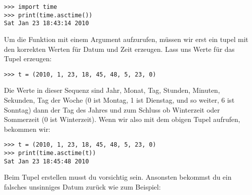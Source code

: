 \begin{Verbatim}[frame=single]
>>> import time
>>> print(time.asctime())
Sat Jan 23 18:43:14 2010
\end{Verbatim}


\noindent
Um die Funktion mit einem Argument aufzurufen, müssen wir erst ein tupel mit den korrekten Werten für Datum und Zeit erzeugen. Lass uns Werte für das Tupel  erzeugen:

\begin{Verbatim}[frame=single]
>>> t = (2010, 1, 23, 18, 45, 48, 5, 23, 0)
\end{Verbatim}

\noindent
Die Werte in dieser Sequenz sind Jahr, Monat, Tag, Stunden, Minuten, Sekunden, Tag der Woche (0 ist Montag, 1 ist Dienstag, und so weiter, 6 ist Sonntag) dann der Tag des Jahres und zum Schluss ob Winterzeit oder Sommerzeit (0 ist Winterzeit). Wenn wir also  mit dem obigen Tupel aufrufen, bekommen wir: 

\begin{Verbatim}[frame=single]
>>> t = (2010, 1, 23, 18, 45, 48, 5, 23, 0)
>>> print(time.asctime(t))
Sat Jan 23 18:45:48 2010
\end{Verbatim}

\noindent
Beim Tupel erstellen musst du vorsichtig sein. Ansonsten bekommst du ein falsches unsinniges Datum zurück wie zum Beispiel:

